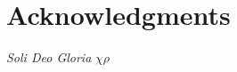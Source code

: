 \documentclass[11pt,a4paper]{article}
\begin{document}
\section*{Acknowledgments}

\standardacknowledgments





\vspace{1em}
\begin{center}
\textit{Soli Deo Gloria} $\chi\rho$
\end{center}
\end{document}

